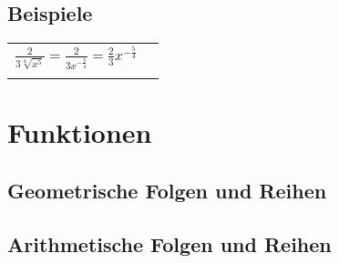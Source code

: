 \documentclass{report}
\begin{document}
\section{Beispiele}

\begin{tabularx}{1\textwidth} { 
    >{\centering\arraybackslash}X 
    >{\centering\arraybackslash}X  }
    \begin{math}
       \frac{2}{3\sqrt[4]{x^5}} = \frac{2}{3x^{-\frac{5}{4}}} = \frac{2}{3}x^{-\frac{5}{4}}
    \end{math}
    &
    \begin{math}
        {}
    \end{math}
    \\ [7pt]
    \begin{math}
        {}
    \end{math}
    &
    \begin{math}
        {}
    \end{math}
    \\ [7pt]
\end{tabularx}


\chapter{Funktionen}

\section{Geometrische Folgen und Reihen}
\section{Arithmetische Folgen und Reihen}
\end{document}
